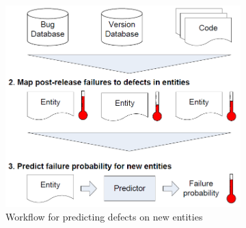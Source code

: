 \documentclass{article}
\begin{document}
 \begin{figure}[H]
     \begin{subfigure}{.5\textwidth}
         \centering
         \includegraphics[scale=0.3]{./src/mining_metrics_overview.png}
         \caption{Workflow for predicting defects on new entities}\label{mining:overview}
     \end{subfigure}%
     \begin{subfigure}{.5\textwidth}
         \centering

\end{subfigure}
\end{figure}
\end{document}
